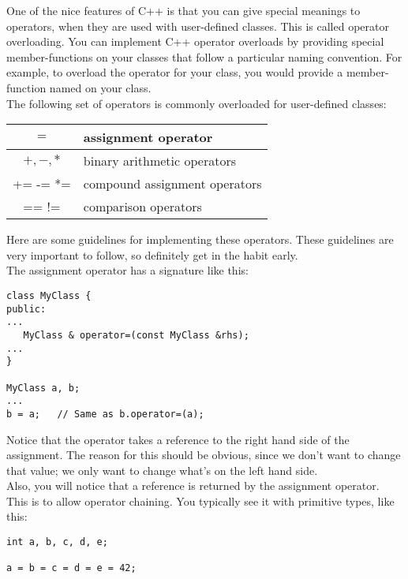 \newpage
{}

One of the nice features of C++ is that you can give special meanings to operators, when they are used with user-defined classes. This is called operator overloading. You can implement C++ operator overloads by providing special member-functions on your classes that follow a particular naming convention. For example, to overload the \btic{+} operator for your class, you would provide a member-function named  on your class.\\

The following set of operators is commonly overloaded for user-defined classes:

\begin{tabular}{| c |  l |}
\hline
$=$ &  assignment operator \\
\hline
$+, -, *$ & binary arithmetic operators\\
\hline
+= -= *=  & compound assignment operators\\
\hline
== != &  comparison operators\\
\hline
\end{tabular}

Here are some guidelines for implementing these operators. These guidelines are very important to follow, so definitely get in the habit early.\\

The assignment operator has a signature like this:\\

\begin{verbatim}
class MyClass {
public:
...
   MyClass & operator=(const MyClass &rhs);
...
}

MyClass a, b;
...
b = a;   // Same as b.operator=(a);
\end{verbatim}

Notice that the \btic{=} operator takes a  reference to the right hand side of the assignment. The reason for this should be obvious, since we don't want to change that value; we only want to change what's on the left hand side.\\

Also, you will notice that a reference is returned by the assignment operator. This is to allow operator chaining. You typically see it with primitive types, like this:\\

\begin{verbatim}
int a, b, c, d, e;

a = b = c = d = e = 42;
\end{verbatim}

